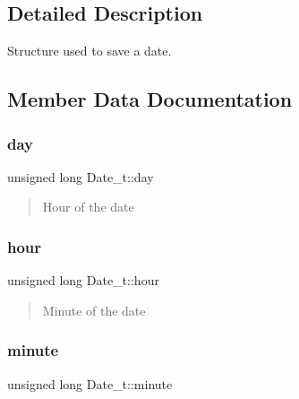 \subsection{Detailed Description}
Structure used to save a date. 

\subsection{Member Data Documentation}
\hypertarget{struct_date__t_a270823800a62aa498b9555c99769a3b5}{}\label{struct_date__t_a270823800a62aa498b9555c99769a3b5} 
\subsubsection{\texorpdfstring{day}{day}}
{\footnotesize\ttfamily unsigned long Date\+\_\+t\+::day}



\begin{quote}
Hour of the date \end{quote}


\hypertarget{struct_date__t_a7fee0e3c9e76065caa6bf859e3a351ea}{}\label{struct_date__t_a7fee0e3c9e76065caa6bf859e3a351ea} 
\subsubsection{\texorpdfstring{hour}{hour}}
{\footnotesize\ttfamily unsigned long Date\+\_\+t\+::hour}



\begin{quote}
Minute of the date \end{quote}


\hypertarget{struct_date__t_a6229b5d29374950a2304217dda206f3e}{}\label{struct_date__t_a6229b5d29374950a2304217dda206f3e} 
\subsubsection{\texorpdfstring{minute}{minute}}
{\footnotesize\ttfamily unsigned long Date\+\_\+t\+::minute}

\hypertarget{struct_date__t_a2ee23f8b842ac810439f48929dc02d0a}{}\label{struct_date__t_a2ee23f8b842ac810439f48929dc02d0a} 

